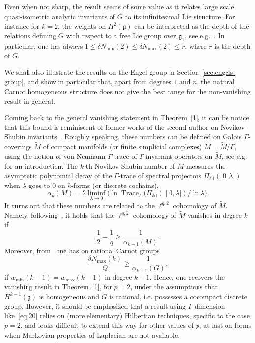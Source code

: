 \documentclass[11pt]{article}
\theoremstyle{definition}
\numberwithin{equation}{section}
\numberwithin{figure}{section}
\numberwithin{table}{section}
\DeclareMathOperator{\Trace}{Trace}
\newcommand{\dd}{\mathrm{d}}
\begin{document}
Even when not sharp, the result seems of some value as it relates large scale quasi-isometric analytic invariants of $G$ to its infinitesimal Lie structure. For instance for $k=2$, the weights on $H^2(\mathfrak{g})$ can be interpreted as the depth of the relations defining $G$ with respect to a free Lie group over $\mathfrak{g}_1$, see e.g.~\cite{Rumin_TSG}. In particular, one has always $1\leq \delta N_{\min}(2) \leq \delta N_{\max}(2) \leq r$, where $r$ is the depth of $G$.


We shall also illustrate the results on the Engel group in Section~\ref{sec:engels-group}, and show in particular that, apart from degrees $1$ and $n$, the natural Carnot homogeneous structure does not give the best range for the non-vanishing result in general.


Coming back to the general vanishing statement in Theorem~\ref{1}, it can be notice that this bound is reminiscent of former works of the second author on Novikov Shubin invariants~\cite{Rumin_TSG, Rumin10}. Roughly speaking, these numbers can be defined on Galois $\Gamma$-coverings $\widetilde M$ of compact manifolds (or finite simplicial complexes) $M = \widetilde M / \Gamma$, using the notion of von Neumann $\Gamma$-trace of $\Gamma$-invariant operators on $\widetilde M$, see e.g.~\cite[Section~1]{Rumin_TSG} for an introduction. The $k$-th Novikov Shubin number of $M$ measures the asymptotic polynomial decay of the $\Gamma$-trace of spectral projectors $\Pi_{\delta \dd} (]0, \lambda])$ when $\lambda $ goes to $0$ on $k$-forms (or discrete cochains),
\begin{equation*}
\alpha_k(M) = 2 \liminf_{\lambda \rightarrow 0}\bigl(\ln
\Trace_\Gamma (\Pi_{\delta \dd} (\mathopen{]}0, \lambda]) / \ln \lambda \bigr).
\end{equation*}
It turns out that these numbers are related to the $\ell^{q,2}$ cohomology of $\widetilde M$. Namely, following~\cite[Theorem~1.10]{Rumin10}, it holds that the $\ell^{q,2}$ cohomology of $\widetilde M$ vanishes in degree $k$ if
\begin{equation}\label{eq:20}
\frac{1}{2} - \frac{1}{q} \geq \frac{1}{\alpha_{k-1}(M)}.
\end{equation}
Moreover, from~\cite[Theorem~3.13]{Rumin_TSG} one has on rational Carnot groups
\begin{equation*}
\frac{\delta N_{\max}(k)}{Q} \geq \frac{1}{\alpha_{k-1}(G)},
\end{equation*}
if $w_{\min}(k-1)= w_{\max}(k-1)$ in degree $k-1$. Hence, one recovers the vanishing result in Theorem~\ref{1}, for $p=2$, under the assumptions that $H^{k-1}(\mathfrak{g})$ is homogeneous and $G$ is rational, i.e. possesses a cocompact discrete group. However, it should be emphasized that a result using $\Gamma$-dimension like~\eqref{eq:20} relies on (more elementary) Hilbertian techniques, specific to the case $p=2$, and looks difficult to extend this way for other values of $p$, at last on forms when Markovian properties of Laplacian are not available.
\end{document}
